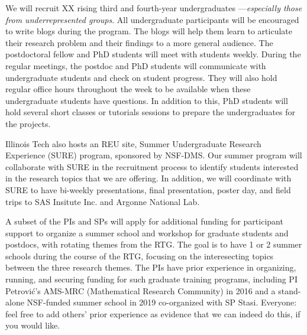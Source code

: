 \documentclass[11pt]{NSFamsart}
\begin{document}
We will recruit XX rising third and fourth-year undergraduates ---\emph{especially those from underrepresented groups}.
All undergraduate participants will be encouraged to write blogs \cite{Hig21a} during the program. The blogs will help them learn to articulate their research problem and their findings to a more general audience. The postdoctoral fellow and PhD
students will meet with students weekly. During the regular meetings, the postdoc and PhD students will communicate with undergraduate students and check on student progress. They will also hold regular office hours throughout the week to be available when these undergraduate students have questions. In addition to this, PhD students will hold several short classes or tutorials sessions to prepare the undergraduates for the projects.

Illinois Tech also hosts an REU site, Summer Undergraduate Research Experience (SURE)  program, sponsored by NSF-DMS.  Our summer program will collaborate with SURE in the recruitment process to identify students interested in the research topics that we are offering. In addition, we will coordinate with SURE to have bi-weekly presentations, final presentation, poster day, and field trips to SAS Insitute Inc. and Argonne National Lab. 


A subset of the PIs and SPs will apply for additional funding for participant support to organize a summer school and workshop for graduate students and postdocs, with rotating themes from the RTG. The goal is to have 1 or 2 summer schools during the course of the RTG, focusing on the interesecting topics between the three research themes. The PIs have prior experience in organizing, running, and securing funding for such graduate training programs, including  PI Petrovi\'c's AMS-MRC (Mathematical Research Community) in 2016 and a stand-alone NSF-funded summer school in 2019 co-organized with SP Stasi. {\color{red}Everyone: feel free to add others' prior experience as evidence that we can indeed do this, if you would like.}
\end{document}
